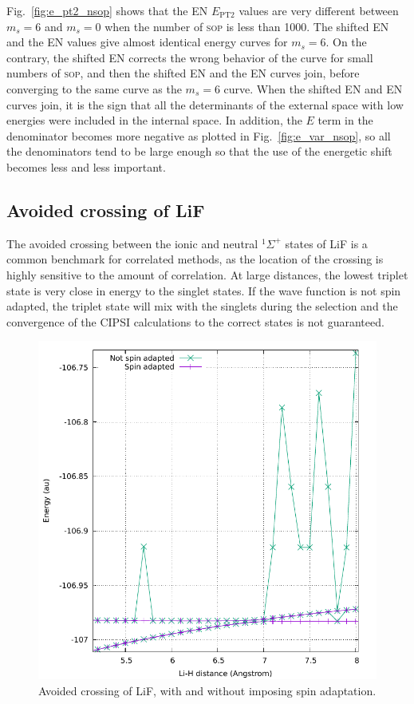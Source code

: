 \documentclass[aip,jcp,reprint,showkeys]{revtex4-1}
\newcommand{\sop}{\textsc{sop}}
\newcommand{\ept}{E_\text{PT2}}
\begin{document}
Fig.~\ref{fig:e_pt2_nsop} shows that the EN $\ept$ values are very different
between $m_s=6$ and $m_s=0$ when the number of \sop{} is less than 1000. The
shifted EN and the EN values give almost identical energy curves for $m_s=6$.
On the contrary, the shifted EN
corrects the wrong behavior of the curve for small numbers of \sop{}, and then
the shifted EN and the EN curves join, before converging to the same curve as
the $m_s=6$ curve. When the shifted EN and EN curves join, it is the sign
that all the determinants of the external space with low energies were included
in the internal space. In addition, the $E$ term in the denominator becomes more
negative as plotted in Fig.~\ref{fig:e_var_nsop}, so all the denominators tend to be large enough so that the use of the energetic shift becomes less and
less important.


\subsection{Avoided crossing of LiF}

The avoided crossing between the ionic and neutral $^1\Sigma^+$ states of LiF is a 
common benchmark for correlated methods, as the location of the crossing is highly
sensitive to the amount of correlation. At large distances, the lowest triplet state
is very close in energy to the singlet states. If the wave function is not
spin adapted, the triplet state will mix with the singlets during the selection
and the convergence of the CIPSI calculations to the correct states is not guaranteed.

\begin{figure}
\includegraphics[width=0.9\columnwidth]{lif}
\caption{Avoided crossing of LiF, with and without imposing spin adaptation.}
\label{fig:lif}
\end{figure}
\end{document}

